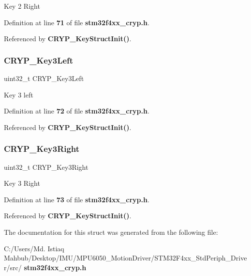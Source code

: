 Key 2 Right 

Definition at line \textbf{ 71} of file \textbf{ stm32f4xx\+\_\+cryp.\+h}.



Referenced by \textbf{ C\+R\+Y\+P\+\_\+\+Key\+Struct\+Init()}.

\mbox{\label{structCRYP__KeyInitTypeDef_abc13841eebf8bd578a408b7c4ea1fb94}} 
\subsubsection{C\+R\+Y\+P\+\_\+\+Key3\+Left}
{\footnotesize\ttfamily uint32\+\_\+t C\+R\+Y\+P\+\_\+\+Key3\+Left}

Key 3 left 

Definition at line \textbf{ 72} of file \textbf{ stm32f4xx\+\_\+cryp.\+h}.



Referenced by \textbf{ C\+R\+Y\+P\+\_\+\+Key\+Struct\+Init()}.

\mbox{\label{structCRYP__KeyInitTypeDef_a5863a834aaae2bd010fdee6663cb64b7}} 
\subsubsection{C\+R\+Y\+P\+\_\+\+Key3\+Right}
{\footnotesize\ttfamily uint32\+\_\+t C\+R\+Y\+P\+\_\+\+Key3\+Right}

Key 3 Right 

Definition at line \textbf{ 73} of file \textbf{ stm32f4xx\+\_\+cryp.\+h}.



Referenced by \textbf{ C\+R\+Y\+P\+\_\+\+Key\+Struct\+Init()}.



The documentation for this struct was generated from the following file\+:\begin{DoxyCompactItemize}
\item 
C\+:/\+Users/\+Md. Istiaq Mahbub/\+Desktop/\+I\+M\+U/\+M\+P\+U6050\+\_\+\+Motion\+Driver/\+S\+T\+M32\+F4xx\+\_\+\+Std\+Periph\+\_\+\+Driver/src/\textbf{ stm32f4xx\+\_\+cryp.\+h}\end{DoxyCompactItemize}
